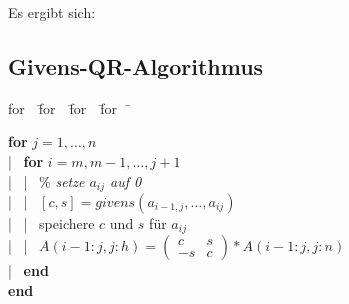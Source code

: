 \documentclass[ngerman,fontsize=11pt, paper=a4, parskip=half, titlepage=true, toc=bib]{scrbook}
\newenvironment{pseudocode}[1]{ %
		\begin{minipage}{#1}
			\begin{framed}
				\hspace*{1em}	
				\begin{minipage}{#1}
					\begin{tabbing}
						for~~\= for~~\= for~~\= for~~\= \kill
	}
	{ %
					\end{tabbing}
				\end{minipage}
				\hspace*{1em}
			\end{framed}
		\end{minipage}
	}
\begin{document}
	
	Es ergibt sich:
	
	\subsection{Givens-QR-Algorithmus} 
	
	\begin{pseudocode}{0.7\linewidth}
		\textbf{for} $j=1, \dotsc , n$ \\
		|~	\>	\textbf{for} $i=m, m-1, \dotsc , j+1$ \\
		|~	\>		|~	\>\% \textit{setze $a_{ij}$ auf 0} \\
		|~	\>		|~	\>$[c,s] = givens(a_{i-1,j}, \dotsc, a_{ij}) $\\
		|~	\>		|~	\>speichere $c$ und $s$ für $a_{ij}$ \\
		|~	\>		|~	\>$A(i-1:j, j:h) =\left( \begin{smallmatrix}c & s\\ -s & c	\end{smallmatrix}\right) * A(i-1:j, j:n)$ \\
		|~	\> \textbf{end}\\
		\textbf{end}							
	\end{pseudocode}
	
\end{document}
